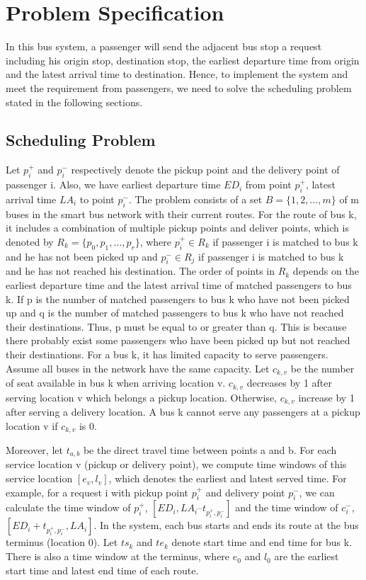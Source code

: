 \documentclass[runningheads]{llncs}
\begin{document}
\section{Problem Specification}
In this bus system, a passenger will send the adjacent bus stop a request including his origin stop, destination stop, the earliest departure time from origin and the latest arrival time to destination. Hence, to implement the system and meet the requirement from passengers, we need to solve the scheduling problem stated in the following sections.
\subsection{Scheduling Problem}
Let $p_i^+$ and $p_i^-$ respectively denote the pickup point and the delivery point of passenger i. Also, we have earliest departure time $ED_i$ from point $p_i^+$, latest arrival time $LA_i$ to point $p_i^-$. The problem consists of a set $B = \{1, 2, …, m\}$ of m buses in the smart bus network with their current routes. For the route of bus k, it includes a combination of multiple pickup points and deliver points, which is denoted by $R_k = \{p_0, p_1, …, p_r\}$, where $p_i^+\in R_k$ if passenger i is matched to bus k and he has not been picked up and $p_i^-\in R_j$ if passenger i is matched to bus k and he has not reached his destination. The order of points in $R_k$ depends on the earliest departure time and the latest arrival time of matched passengers to bus k. If p is the number of matched passengers to bus k who have not been picked up and q is the number of matched passengers to bus k who have not reached their destinations. Thus, p must be equal to or greater than q. This is because there probably exist some passengers who have been picked up but not reached their destinations. For a bus k, it has limited capacity to serve passengers. Assume all buses in the network have the same capacity. Let $c_{k,v}$ be the number of seat available in bus k when arriving location v. $c_{k,v}$ decreases by 1 after serving location v which belongs a pickup location. Otherwise, $c_{k,v}$ increase by 1 after serving a delivery location. A bus k cannot serve any passengers at a pickup location v if $c_{k,v}$ is 0.

Moreover, let $t_{a,b}$ be the direct travel time between points a and b. For each service location v (pickup or delivery point), we compute time windows of this service location $[e_v, l_v]$, which denotes the earliest and latest served time. For example, for a request i with pickup point $p_i^+$ and delivery point $p_i^-$, we can calculate the time window of $p_i^+$, $[ED_i, LA_i – t_{p_i^+,p_i^-}]$ and the time window of $c_i^-$, $[ED_i + t_{p_i^+,p_i^-}, LA_i]$. In the system, each bus starts and ends its route at the bus terminus (location 0). Let $ts_k$ and $te_k$ denote start time and end time for bus k. There is also a time window at the terminus, where $e_0$ and $l_0$ are the earliest start time and latest end time of each route.
\end{document}
